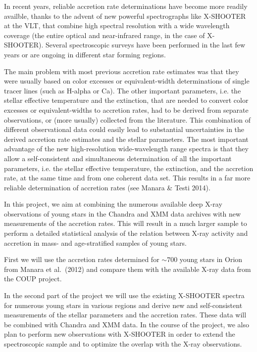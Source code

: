 In recent years,  
reliable accretion rate determinations  have become more readily availble,
thanks to the advent of new powerful spectrographs like
X-SHOOTER at the VLT, that combine high spectral resolution
with a wide wavelength coverage (the entire optical and
near-infrared range, in the case of X-SHOOTER).
Several spectroscopic surveys have been performed in the last few years or are ongoing
in different star forming regions.

The main problem with most  previous accretion rate estimates was
 that they were usually 
based on color excesses or equivalent-width determinations of single tracer lines
(such as H-alpha or Ca). The other important parameters, i.e. the  stellar effective
temperature and the extinction, that are needed to convert color excesses or 
equivalent-widths to accretion rates, had to be derived from separate observations,
or (more usually) collected from the literature.
This combination of different observational data could easily lead to
substantial uncertainties in the derived accretion rate estimates and the stellar parameters.
%
The most important advantage of the new high-resolution wide-wavelength range 
spectra is that they allow a self-consistent and simultaneous 
determination of all the important parameters,  i.e. the
stellar effective temperature, the extinction, and the accretion rate, at the same time and
from one coherent data set.
This results in a far more reliable determination of accretion rates (see Manara \& Testi 
2014). 

\vspace{0.5em}
%

 

In this project, we aim at combining the numerous available deep
X-ray observations of young stars in the Chandra and XMM data
archives with new measurements of the accretion rates.
This will result in a much larger sample to perform a detailed statistical analysis
of the relation between X-ray activity and accretion in mass- and age-stratified
samples of young stars.

First we will use the accretion rates  determined for $\sim 700$ young stars
in Orion from Manara et al.~(2012) and compare them 
with the available X-ray data from the COUP project.

In the second part of the project we will use the existing X-SHOOTER spectra for 
numerous young stars
in various regions and derive new and self-consistent measurements of the
stellar parameters and the accretion rates. These data will be combined with
Chandra and XMM data. In the course of the project, we also plan to perform new
observations with X-SHOOTER in order to extend the
spectroscopic sample and to optimize the overlap with the X-ray observations.

